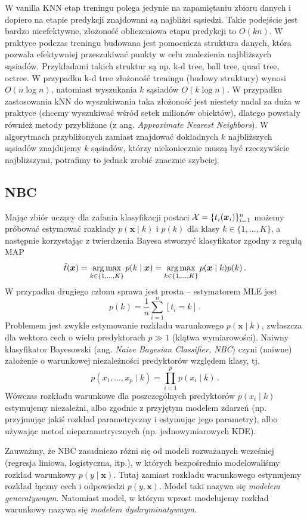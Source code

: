 \documentclass{myclass}
\begin{document}
W vanilla KNN etap treningu polega jedynie na zapamiętaniu zbioru danych i dopiero na etapie
predykcji znajdowani są najbliżsi sąsiedzi. Takie podejście jest bardzo nieefektywne, złożoność
obliczeniowa etapu predykcji to \(O(kn)\). W praktyce podczas treningu budowana jest pomocnicza
struktura danych, która pozwala efektywniej przeszukiwać punkty w celu znalezienia najbliższych
sąsiadów. Przykładami takich struktur są np. k-d tree, ball tree, quad tree, octree. W przypadku k-d
tree złożoność treningu (budowy struktury) wynosi \(O(n \log n)\), natomiast wyszukania \(k\)
sąsiadów \(O(k \log n)\). W przypadku zastosowania kNN do wyszukiwania taka złożoność jest niestety
nadal za duża w praktyce (chcemy wyszukiwać wśród setek milionów obiektów), dlatego powstały również
metody przybliżone (z ang. \textit{Approximate Nearest Neighbors}). W algorytmach
przybliżonych zamiast znajdować dokładnych \(k\) najbliższych sąsiadów znajdujemy \(k\) sąsiadów,
którzy niekoniecznie muszą być rzeczywiście najbliższymi, potrafimy to jednak zrobić znacznie
szybciej.


\subsection{NBC}

Mając zbiór uczący dla zafania klasyfikacji postaci $\mathcal{X} = \{t_i(\bm{x}_i)\}_{i=1}^n$ możemy
próbować estymować rozkłady $p(\bm{x} \mid k)$ i $p(k)$ dla klasy $k \in \{1,\ldots,K\}$, a
następnie korzystając z twierdzenia Bayesa stworzyć klasyfikator zgodny z regułą MAP
\[
    \hat{t}(\bm{x}) = \operatorname*{arg\,max}_{k \in \{1,\ldots,K\}} p(k \mid \bm{x}) = \operatorname*{arg\,max}_{k \in \{1,\ldots,K\}} p(\bm{x} \mid k) p(k)\,.
\]
W przypadku drugiego członu sprawa jest prosta -- estymatorem MLE jest
\[
    p(k) = \frac{1}{n} \sum_{i=1}^n [t_i = k]\,.
\]
Problemem jest zwykle estymowanie rozkładu warunkowego $p(\bm{x} \mid k)$, zwłaszcza dla wektora
cech o wielu predyktorach $p \gg 1$ (klątwa wymiarowości). Naiwny klasyfikator Bayesowski (ang. \emph{Naive Bayesian
Classifier, NBC}) czyni (naiwne) założenie o warunkowej niezależności predyktorów względem klasy,
tj.
\[
    p(x_1,\ldots,x_p \mid k) = \prod_{i=1}^p p(x_i \mid k)\,.
\]
Wówczas rozkładu warunkowe dla poszczególnych predyktorów $p(x_i \mid k)$ estymujemy niezależni,
albo zgodnie z przyjętym modelem zdarzeń (np. przyjmując jakiś rozkład parametryczny i estymując
jego parametry), albo używając metod nieparametrycznych (np. jednowymiarowych KDE).

Zauważmy, że NBC zasadniczo różni się od modeli rozważanych wcześniej (regresja liniowa,
logistyczna, itp.), w których bezpośrednio modelowaliśmy rozkład warunkowy $p(y \mid \bm{x})$. Tutaj
zamiast rozkładu warunkowego estymujemy rozkład łączny cech i odpowiedzi $p(y, \bm{x})$. Model taki
nazywa się \emph{modelem generatywnym}. Natomiast model, w którym wprost modelujemy rozkład
warunkowy nazywa się \emph{modelem dyskryminatywnym}.
\end{document}
